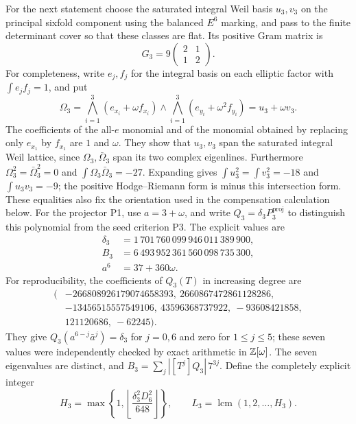 For the next statement choose the saturated integral Weil basis
$u_3,v_3$ on the principal sixfold component using the balanced
$E^6$ marking, and pass to the finite determinant cover so that
these classes are flat. Its positive Gram matrix is
\[
 G_3=9\begin{pmatrix}2&1\\1&2\end{pmatrix}.
\]
For completeness, write $e_j,f_j$ for the integral basis on each
elliptic factor with $\int e_jf_j=1$, and put
\[
 \Omega_3=\bigwedge_{i=1}^3(e_{x_i}+\omega f_{x_i})
          \wedge\bigwedge_{i=1}^3(e_{y_i}+\omega^2f_{y_i})
          =u_3+\omega v_3.
\]
The coefficients of the all-$e$ monomial and of the monomial
obtained by replacing only $e_{x_1}$ by $f_{x_1}$ are $1$ and
$\omega$. They show that $u_3,v_3$ span the saturated integral
Weil lattice, since $\Omega_3,\bar\Omega_3$ span its two complex
eigenlines. Furthermore $\Omega_3^2=\bar\Omega_3^2=0$ and
$\int\Omega_3\bar\Omega_3=-27$. Expanding gives
$\int u_3^2=\int v_3^2=-18$ and $\int u_3v_3=-9$;
the positive Hodge--Riemann form is minus this intersection form.
These equalities also fix the orientation used in the
compensation calculation below.
For the projector P1, use $a=3+\omega$, and write
$Q_3=\delta_3P_3^{\mathrm{proj}}$ to distinguish this polynomial
from the seed criterion P3. The explicit values are
\begin{align*}
 \delta_3&=1\,701\,760\,099\,946\,011\,389\,900,\\
 B_3&=6\,493\,952\,361\,560\,098\,735\,300,\\
 a^6&=37+360\omega.
\end{align*}
For reproducibility, the coefficients of $Q_3(T)$ in increasing
degree are
\[
\begin{split}
(&-266808926179074658393,\ 2660867472861128286,\\
 &-13456515557549106,\ 43596368737922,\ -93608421858,\\
 &121120686,\ -62245).
\end{split}
\]
They give $Q_3(a^{6-j}\bar a^j)=\delta_3$ for $j=0,6$ and zero
for $1\le j\le5$; these seven values were independently checked
by exact arithmetic in $\mathbb Z[\omega]$. The seven eigenvalues are
distinct, and
$B_3=\sum_j |[T^j]Q_3|\,7^{3j}$.
Define the completely explicit integer
\begin{equation}\label{eq:M10H3}
 H_3=\max\left\{1,
   \left\lfloor\frac{\delta_3^2D_6^2}{648}\right\rfloor\right\},
 \qquad L_3=\operatorname{lcm}(1,2,\ldots,H_3).
\end{equation}

